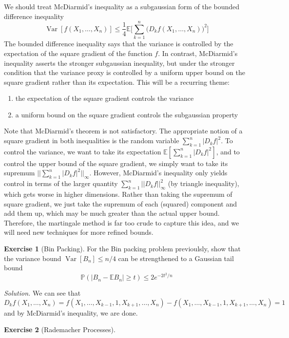 \documentclass{article}
\DeclareMathOperator{\Var}{Var}
\theoremstyle{definition}
\newtheorem{exercise}{Exercise}[section]
\theoremstyle{remark}
\theoremstyle{definition}
\newenvironment{solution}{\noindent \textit{Solution.}}{}
\begin{document}
We should treat McDiarmid's inequality as a subgaussian form of the bounded difference inequality 
\[\Var[ f(X_1, \ldots, X_n)] \leq \frac{1}{4} \mathbb{E} \bigg[ \sum_{k=1}^n \big(D_k f (X_1, \ldots, X_n)\big)^2 \bigg]\]
The bounded difference inequality says that the variance is controlled by the expectation of the square gradient of the function $f$. In contrast, McDiarmid's inequality asserts the stronger subgaussian inequality, but under the stronger condition that the variance proxy is controlled by a uniform upper bound on the square gradient rather than its expectation. This will be a recurring theme: 
\begin{enumerate}
    \item the expectation of the square gradient controls the variance 
    \item a uniform bound on the square gradient controls the subgaussian property
\end{enumerate}
Note that McDiarmid's theorem is not satisfactory. The appropriate notion of a square gradient in both inequalities is the random variable $\sum_{k=1}^n |D_k f|^2$. To control the variance, we want to take its expectation $\mathbb{E} [\sum_{k=1}^n |D_k f|^2]$, and to control the upper bound of the square gradient, we simply want to take its supremum $|| \sum_{k=1}^n |D_k f|^2||_\infty$. However, McDiarmid's inequality only yields control in terms of the larger quantity $\sum_{k=1}^n || D_k f||^2_\infty$ (by triangle inequality), which gets worse in higher dimensions. Rather than taking the supremum of square gradient, we just take the supremum of each (squared) component and add them up, which may be much greater than the actual upper bound. Therefore, the martingale method is far too crude to capture this idea, and we will need new techniques for more refined bounds. 

\begin{exercise}[Bin Packing]
For the Bin packing problem previoulsly, show that the variance bound $\Var[B_n] \leq n/4$ can be strengthened to a Gaussian tail bound 
\[\mathbb{P}(|B_n - \mathbb{E} B_n| \geq t) \leq 2e^{-2t^2/n}\]
\end{exercise}
\begin{solution}
We can see that 
\[D_k f(X_1, \ldots, X_n) = f(X_1, \ldots, X_{k-1}, 1, X_{k+1}, \ldots, X_n) - f(X_1, \ldots, X_{k-1}, 1, X_{k+1}, \ldots, X_n) = 1\]
and by McDiarmid's inequality, we are done. 
\end{solution}

\begin{exercise}[Rademacher Processes]

\end{exercise}
\end{document}
